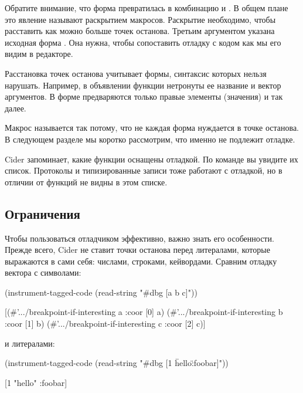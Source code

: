 Обратите внимание, что форма  превратилась в комбинацию  и . В общем плане это явление называют раскрытием макросов. Раскрытие необходимо, чтобы расставить как можно больше точек останова. Третьим аргументом указана исходная форма . Она нужна, чтобы сопоставить отладку с кодом как мы его видим в редакторе.

Расстановка точек останова учитывает формы, синтаксис которых нельзя нарушать. Например, в объявлении функции нетронуты ее название и вектор аргументов. В форме  предваряются только правые элементы (значения) и так далее.

Макрос  называется так потому, что не каждая форма нуждается в точке останова. В следующем разделе мы коротко рассмотрим, что именно не подлежит отладке.

Cider запоминает, какие функции оснащены отладкой. По команде  вы увидите их список. Протоколы и типизированные записи тоже работают с отладкой, но в отличии от функций не видны в этом списке.

\subsection{Ограничения}

Чтобы пользоваться отладчиком эффективно, важно знать его особенности. Прежде всего, Cider не ставит точки останова перед литералами, которые выражаются в сами себя: числами, строками, кейвордами. Сравним отладку вектора с символами:

\begin{english}
  \begin{clojure}
(instrument-tagged-code
 (read-string "#dbg [a b c]"))

[(#'.../breakpoint-if-interesting a {:coor [0]} a)
 (#'.../breakpoint-if-interesting b {:coor [1]} b)
 (#'.../breakpoint-if-interesting c {:coor [2]} c)]
  \end{clojure}
\end{english}

и литералами:

\begin{english}
  \begin{clojure}
(instrument-tagged-code
 (read-string "#dbg [1 \"hello\" :foobar]"))

[1 "hello" :foobar]
  \end{clojure}
\end{english}

